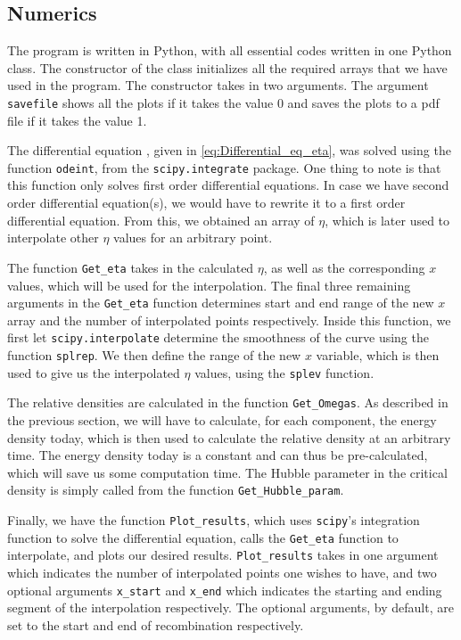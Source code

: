 \documentclass[12pt]{article}
\begin{document}
\subsection*{Numerics}
The program is written in Python, with all essential codes written in one Python class. The constructor of the class initializes all the required arrays that we have used in the program. The constructor takes in two arguments. The argument \verb|savefile| shows all the plots if it takes the value 0 and saves the plots to a pdf file if it takes the value 1. 

The differential equation , given in \ref{eq:Differential_eq_eta}, was solved using the function \verb|odeint|, from the \verb|scipy.integrate| package. One thing to note is that this function only solves first order differential equations. In case we have second order differential equation(s), we would have to rewrite it to a first order differential equation. From this, we obtained an array of $\eta$, which is later used to interpolate other $\eta$ values for an arbitrary point.

The function \verb|Get_eta| takes in the calculated $\eta$, as well as the corresponding $x$ values, which will be used for the interpolation. The final three remaining arguments in the \verb|Get_eta| function determines start and end range of the new $x$ array and the number of interpolated points respectively. Inside this function, we first let \texttt{scipy.interpolate} determine the smoothness of the curve using the function \texttt{splrep}. We then define the range of the new $x$ variable, which is then used to give us the interpolated $\eta$ values, using the \texttt{splev} function.

The relative densities are calculated in the function \verb|Get_Omegas|. As described in the previous section, we will have to calculate, for each component, the energy density today, which is then used to calculate the relative density at an arbitrary time. The energy density today is a constant and can thus be pre-calculated, which will save us some computation time. The Hubble parameter in the critical density is simply called from the function \verb|Get_Hubble_param|.

Finally, we have the function \verb|Plot_results|, which uses \texttt{scipy}'s integration function to solve the differential equation, calls the \verb|Get_eta| function to interpolate, and plots our desired results. \verb|Plot_results| takes in one argument which indicates the number of interpolated points one wishes to have, and two optional arguments \verb|x_start| and \verb|x_end| which indicates the starting and ending segment of the interpolation respectively. The optional arguments, by default, are set to the start and end of recombination respectively.
\end{document}

